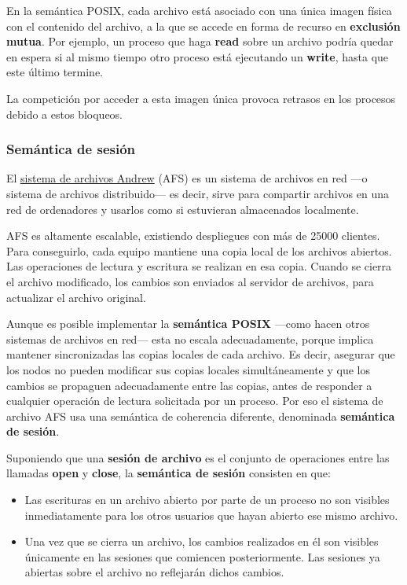 En la semántica POSIX, cada archivo está asociado con una única imagen
física con el contenido del archivo, a la que se accede en forma de
recurso en \textbf{exclusión mutua}. Por ejemplo, un proceso que haga
\textbf{read} sobre un archivo podría quedar en espera si al mismo
tiempo otro proceso está ejecutando un \textbf{write}, hasta que este
último termine.

La competición por acceder a esta imagen única provoca retrasos en los
procesos debido a estos bloqueos.

\subsubsection{Semántica de sesión}\label{_semuxe1ntica_de_sesiuxf3n}

{} El \href{https://es.wikipedia.org/wiki/Andrew_File_System}{sistema de
archivos Andrew} (AFS) es un sistema de archivos en red ---o sistema de
archivos distribuido--- es decir, sirve para compartir archivos en una
red de ordenadores y usarlos como si estuvieran almacenados localmente.

AFS es altamente escalable, existiendo despliegues con más de 25000
clientes. Para conseguirlo, cada equipo mantiene una copia local de los
archivos abiertos. Las operaciones de lectura y escritura se realizan en
esa copia. Cuando se cierra el archivo modificado, los cambios son
enviados al servidor de archivos, para actualizar el archivo original.

Aunque es posible implementar la \textbf{semántica POSIX} ---como hacen
otros sistemas de archivos en red--- esta no escala adecuadamente,
porque implica mantener sincronizadas las copias locales de cada
archivo. Es decir, asegurar que los nodos no pueden modificar sus copias
locales simultáneamente y que los cambios se propaguen adecuadamente
entre las copias, antes de responder a cualquier operación de lectura
solicitada por un proceso. Por eso el sistema de archivo AFS usa una
semántica de coherencia diferente, denominada \textbf{semántica de
sesión}.

Suponiendo que una \textbf{{}sesión de archivo} es el conjunto de
operaciones entre las llamadas \textbf{open} y \textbf{close}, la
\textbf{semántica de sesión} consisten en que:

\begin{itemize}
\item
  Las escrituras en un archivo abierto por parte de un proceso no son
  visibles inmediatamente para los otros usuarios que hayan abierto ese
  mismo archivo.
\item
  Una vez que se cierra un archivo, los cambios realizados en él son
  visibles únicamente en las sesiones que comiencen posteriormente. Las
  sesiones ya abiertas sobre el archivo no reflejarán dichos cambios.
\end{itemize}

